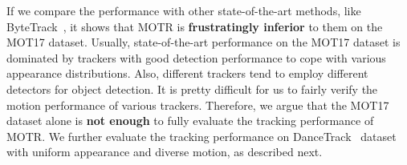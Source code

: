 \documentclass[runningheads]{llncs}
\begin{document}
If we compare the performance with other state-of-the-art methods, like ByteTrack~\cite{zhang2021bytetrack}, it shows that MOTR is \textbf{frustratingly inferior} to them on the MOT17 dataset. Usually, state-of-the-art performance on the MOT17 dataset is dominated by trackers with good detection performance to cope with various appearance distributions. Also, different trackers tend to employ different detectors for object detection. It is pretty difficult for us to fairly verify the motion performance of various trackers. Therefore, we argue that the MOT17 dataset alone is \textbf{not enough} to fully evaluate the tracking performance of MOTR.
We further evaluate the tracking performance on DanceTrack~\cite{peize2021dance} dataset with uniform appearance and diverse motion, as described next.


\begin{table}[t]
  \centering
  \caption{Performance comparison between MOTR and existing methods on the MOT17 dataset under the private detection protocols. The number is marked in bold if it is the best among the Transformer-based methods.}
\end{table}
\end{document}
